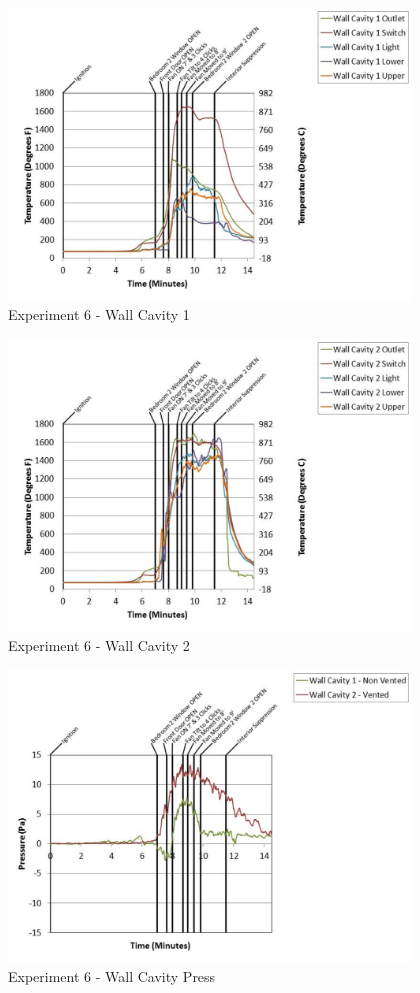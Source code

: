 \documentclass{article}
\begin{document}
\begin{appendices}
	\begin{figure}[h!]
		\centering
		\includegraphics[height=3.05in]{0_Images/Results_Charts/Exp_6_Charts/WallCavity1.pdf}
		\caption{Experiment 6 - Wall Cavity 1}
	\end{figure}
 
	\clearpage

	\begin{figure}[h!]
		\centering
		\includegraphics[height=3.05in]{0_Images/Results_Charts/Exp_6_Charts/WallCavity2.pdf}
		\caption{Experiment 6 - Wall Cavity 2}
	\end{figure}
 

	\begin{figure}[h!]
		\centering
		\includegraphics[height=3.05in]{0_Images/Results_Charts/Exp_6_Charts/WallCavityPress.pdf}
		\caption{Experiment 6 - Wall Cavity Press}
	\end{figure}
 

\end{appendices}
\end{document}
